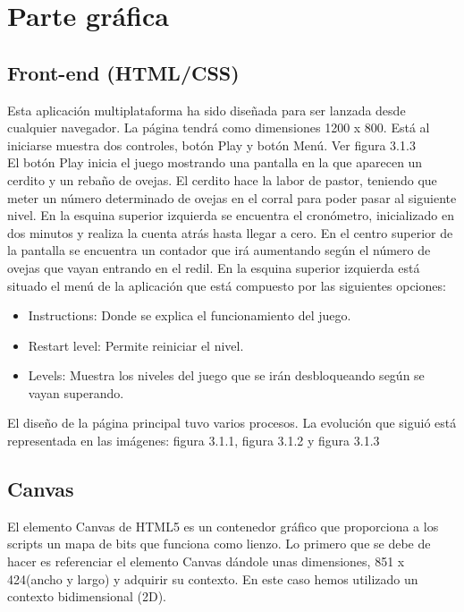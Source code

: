 \section{Parte gráfica}
\label{chap:grafica}

\subsection{Front-end (HTML/CSS)}
\label{sec:front_end}

Esta aplicación multiplataforma ha sido diseñada para ser lanzada desde cualquier navegador. La página tendrá como dimensiones 1200 x 800. 
Está al iniciarse muestra dos controles, botón Play y botón Menú. Ver figura 3.1.3\\

El botón Play inicia el juego mostrando una pantalla en la que aparecen un cerdito y un rebaño de ovejas. El cerdito hace la labor de pastor, 
teniendo que meter un número determinado de ovejas en el corral para poder pasar al siguiente nivel. 
En la esquina superior izquierda se encuentra el cronómetro, inicializado en dos minutos y realiza la cuenta atrás hasta llegar a cero.
En el centro superior de la pantalla se encuentra un contador que irá aumentando según el número de ovejas que vayan entrando en el redil.
En la esquina superior izquierda está situado el menú de la aplicación que está compuesto por las siguientes opciones:

\begin{itemize}
 \item Instructions: Donde se explica el funcionamiento del juego.
 \item Restart level: Permite reiniciar el nivel.
 \item Levels: Muestra los niveles del juego que se irán desbloqueando según se vayan superando.
\end{itemize}

El diseño de la página principal tuvo varios procesos. La evolución que siguió está representada en las imágenes: figura 3.1.1, figura 3.1.2 y 
figura 3.1.3 


\subsection{Canvas}
\label{sec:canvas}

El elemento Canvas  de HTML5 es un contenedor gráfico que  proporciona a los scripts  un mapa de bits  que funciona como lienzo.
Lo primero que se debe de hacer es referenciar el elemento Canvas dándole unas dimensiones, 851 x 424(ancho y largo) y adquirir su contexto.
En este caso hemos utilizado un contexto bidimensional (2D).\\

